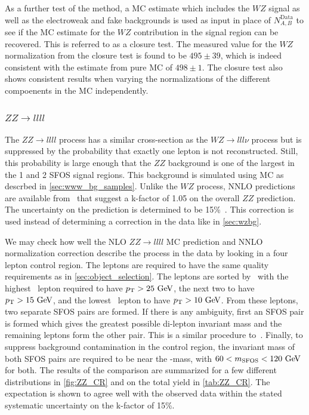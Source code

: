 As a further test of the method, a MC estimate which includes the $WZ$ signal as
well as the electroweak and fake backgrounds is used as input in place 
of $N^{\textrm{Data}}_{A,B}$ to see if the MC estimate for the $WZ$
contribution in the signal region can be recovered. This is referred to as
a closure test.  The measured value for the $WZ$ normalization from the 
closure test is found to be  $495\pm39$, which is indeed consistent with the
estimate from pure MC of $498\pm1$. The closure test also shows consistent
results when varying the normalizations of the different compoenents 
in the MC independently.




\subsubsection{$ZZ\rightarrow llll$}
\label{sec:zzbg}

The $ZZ\rightarrow llll$ process has a similar cross-section as 
the $WZ\rightarrow lll\nu$ process but is 
suppressed by the probability that exactly one lepton is not reconstructed. 
Still, this probability is large enough that the $ZZ$ background is one of the 
largest in the 1 and 2 SFOS signal regions.  This background is simulated
using MC as descrbed in \sec\ref{sec:www_bg_samples}.
Unlike the $WZ$ process, NNLO predictions are available 
from~\cite{Cascioli:2014yka,Baglio:2013toa,Bierweiler:2013dja}
that suggest a k-factor of 1.05 on the overall $ZZ$ prediction.
The uncertainty on the prediction is determined to be 
15\%~\cite{Cascioli:2014yka,Baglio:2013toa,Bierweiler:2013dja}.
This correction is used instead of determining a correction in the data
like in \sec\ref{sec:wzbg}.

We may check how well the NLO $ZZ\rightarrow llll$ MC prediction and 
NNLO normalization correction describe the process in the data by looking
in a four lepton control region. The leptons are required to have
the same quality requirements as in \sec\ref{sec:object_selection}.
The leptons are sorted by \pt~with the highest \pt~lepton
required to have $\pt>25\GeV$, the next two to have
$\pt>15\GeV$, and the lowest \pt~lepton to have $\pt>10\GeV$.
From these leptons, two separate SFOS pairs are formed. If there
is any ambiguity, first an SFOS pair is formed which gives the greatest
possible di-lepton invariant mass and the remaining leptons form the other pair.
This is a similar procedure to~\cite{Aad:2014wra}. Finally, 
to suppress background contamination in the control region,
the invariant mass of both SFOS pairs are required to be near the \z-mass, 
with $60<m_{\textrm{SFOS}}<120\GeV$ for both.
The results of the comparison are summarized for a few different distributions
in \fig\ref{fig:ZZ_CR} and on the total yield in \tab\ref{tab:ZZ_CR}.
The expectation is shown to agree well with the observed data within the 
stated systematic uncertainty on the k-factor of 15\%. 


